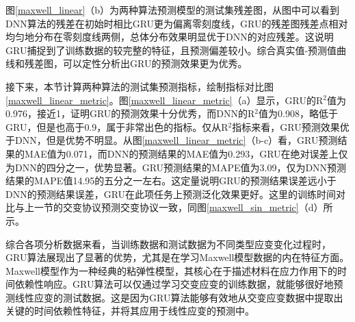 图\ref{maxwell_linear}（b）为两种算法预测模型的测试集残差图，从图中可以看到DNN算法的残差在初始时相比GRU更为偏离零刻度线，GRU的残差图残差点相对均匀地分布在零刻度线两侧，总体分布效果明显优于DNN的对应残差。这说明GRU捕捉到了训练数据的较完整的特征，且预测偏差较小。综合真实值-预测值曲线和残差图，可以定性分析出GRU的预测效果更为优秀。

接下来，本节计算两种算法的测试集预测指标，绘制指标对比图\ref{maxwell_linear_metric}。图\ref{maxwell_linear_metric}（a）显示，GRU的R$^2$值为0.976，接近1，证明GRU的预测效果十分优秀，而DNN的R$^2$值为0.908，略低于GRU，但是也高于0.9，属于非常出色的指标。仅从R$^2$指标来看，GRU预测效果优于DNN，但是优势不明显。从图\ref{maxwell_linear_metric}（b-c）看，GRU预测结果的MAE值为0.071，而DNN的预测结果的MAE值为0.293，GRU在绝对误差上仅为DNN的四分之一，优势显著。GRU预测结果的MAPE值为3.09，仅为DNN预测结果的MAPE值14.95的五分之一左右。这定量说明GRU的预测结果误差远小于DNN的预测结果误差，GRU在此项任务上预测泛化效果更好。这里的训练时间对比与上一节的交变协议预测交变协议一致，同图\ref{maxwell_sin_metric}（d）所示。


综合各项分析数据来看，当训练数据和测试数据为不同类型应变变化过程时，GRU算法展现出了显著的优势，尤其是在学习Maxwell模型数据的内在特征方面。Maxwell模型作为一种经典的粘弹性模型，其核心在于描述材料在应力作用下的时间依赖性响应。GRU算法可以仅通过学习交变应变的训练数据，就能够很好地预测线性应变的测试数据。这是因为GRU算法能够有效地从交变应变数据中提取出关键的时间依赖性特征，并将其应用于线性应变的预测中。
